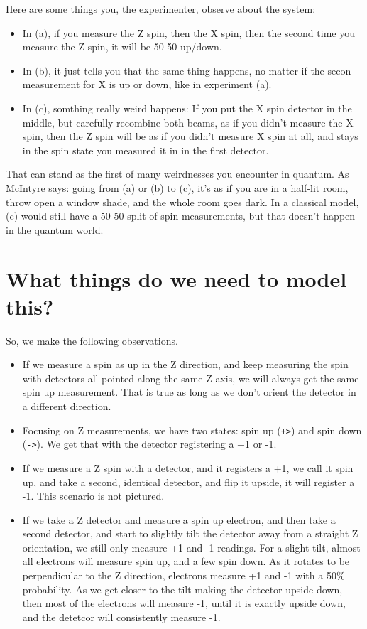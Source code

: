 \documentclass[
]{book}
\providecommand{\tightlist}{%
  \setlength{\itemsep}{0pt}\setlength{\parskip}{0pt}}
\begin{document}
Here are some things you, the experimenter, observe about the system:

\begin{itemize}
\tightlist
\item
  In (a), if you measure the Z spin, then the X spin, then the second time you measure the Z spin, it will be 50-50 up/down.
\item
  In (b), it just tells you that the same thing happens, no matter if the secon measurement for X is up or down, like in experiment (a).
\item
  In (c), somthing really weird happens: If you put the X spin detector in the middle, but carefully recombine both beams, as if you didn't measure the X spin, then the Z spin will be as if you didn't measure X spin at all, and stays in the spin state you measured it in in the first detector.
\end{itemize}

That can stand as the first of many weirdnesses you encounter in quantum. As McIntyre says: going from (a) or (b) to (c), it's as if you are in a half-lit room, throw open a window shade, and the whole room goes dark. In a classical model, (c) would still have a 50-50 split of spin measurements, but that doesn't happen in the quantum world.

\hypertarget{what-things-do-we-need-to-model-this}{%
\section{What things do we need to model this?}\label{what-things-do-we-need-to-model-this}}

So, we make the following observations.

\begin{itemize}
\tightlist
\item
  If we measure a spin as up in the Z direction, and keep measuring the spin with detectors all pointed along the same Z axis, we will always get the same spin up measurement. That is true as long as we don't orient the detector in a different direction.
\item
  Focusing on Z measurements, we have two states: spin up (\texttt{\textbar{}+\textgreater{}}) and spin down (\texttt{\textbar{}-\textgreater{}}). We get that with the detector registering a +1 or -1.
\item
  If we measure a Z spin with a detector, and it registers a +1, we call it spin up, and take a second, identical detector, and flip it upside, it will register a -1. This scenario is not pictured.
\item
  If we take a Z detector and measure a spin up electron, and then take a second detector, and start to slightly tilt the detector away from a straight Z orientation, we still only measure +1 and -1 readings. For a slight tilt, almost all electrons will measure spin up, and a few spin down. As it rotates to be perpendicular to the Z direction, electrons measure +1 and -1 with a 50\% probability. As we get closer to the tilt making the detector upside down, then most of the electrons will measure -1, until it is exactly upside down, and the detetcor will consistently measure -1.
\end{itemize}
\end{document}
